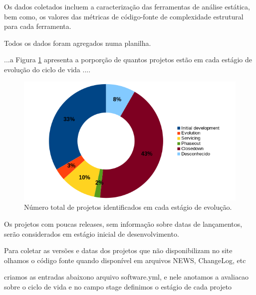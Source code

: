Os dados coletados incluem a caracterização das ferramentas de análise
estática, bem como, os valores das métricas de código-fonte de complexidade
estrutural para cada ferramenta.

Todos os dados foram agregados numa planilha.

...a Figura \ref{life-cycle} apresenta a porporção de quantos projetos estão em
cada estágio de evolução do ciclo de vida ....

\begin{figure}[h]
  \begin{minipage}{0.5\textwidth}
    \centering
    \includegraphics[scale=0.55]{imagens/life-cycle-pie.png}
  \end{minipage}
  \begin{minipage}{0.5\textwidth}
    \centering
    
  \end{minipage}
  \caption{Número total de projetos identificados em cada estágio de evolução.}
  \label{life-cycle}
\end{figure}

Os projetos com poucas releases, sem informação sobre datas de lançamentos, serão
considerados em estágio inicial de desenvolvimento.

Para coletar as versões e datas dos projetos que não disponibilizam no site olhamos
o código fonte quando disponível em arquivos NEWS, ChangeLog, etc

criamos as entradas abaixono arquivo software.yml, e nele anotamos
a avaliacao sobre o ciclo de vida e no campo stage definimos o estágio
de cada projeto




